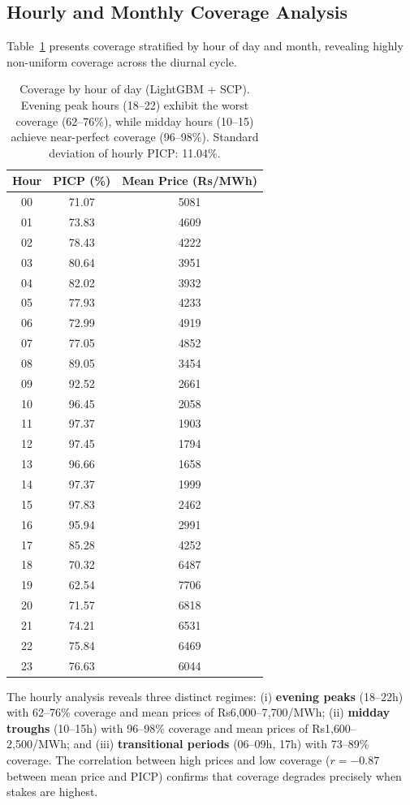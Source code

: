 \documentclass[preprint,12pt]{elsarticle}
\begin{document}
\begin{enumerate}
\subsection{Hourly and Monthly Coverage Analysis}\label{sec:hourly}

Table~\ref{tab:hourly} presents coverage stratified by hour of day and month, revealing highly non-uniform coverage across the diurnal cycle.

\begin{table}[t]
\centering
\caption{Coverage by hour of day (LightGBM + SCP). Evening peak hours (18--22) exhibit the worst coverage (62--76\%), while midday hours (10--15) achieve near-perfect coverage (96--98\%). Standard deviation of hourly PICP: 11.04\%.}
\label{tab:hourly}
\begin{tabular}{ccc}
\toprule
\textbf{Hour} & \textbf{PICP (\%)} & \textbf{Mean Price (Rs/MWh)} \\
\midrule
00 & 71.07 & 5081 \\
01 & 73.83 & 4609 \\
02 & 78.43 & 4222 \\
03 & 80.64 & 3951 \\
04 & 82.02 & 3932 \\
05 & 77.93 & 4233 \\
06 & 72.99 & 4919 \\
07 & 77.05 & 4852 \\
08 & 89.05 & 3454 \\
09 & 92.52 & 2661 \\
10 & 96.45 & 2058 \\
11 & 97.37 & 1903 \\
12 & 97.45 & 1794 \\
13 & 96.66 & 1658 \\
14 & 97.37 & 1999 \\
15 & 97.83 & 2462 \\
16 & 95.94 & 2991 \\
17 & 85.28 & 4252 \\
18 & 70.32 & 6487 \\
19 & 62.54 & 7706 \\
20 & 71.57 & 6818 \\
21 & 74.21 & 6531 \\
22 & 75.84 & 6469 \\
23 & 76.63 & 6044 \\
\bottomrule
\end{tabular}
\end{table}

The hourly analysis reveals three distinct regimes: (i) \textbf{evening peaks} (18--22h) with 62--76\% coverage and mean prices of Rs6{,}000--7{,}700/MWh; (ii) \textbf{midday troughs} (10--15h) with 96--98\% coverage and mean prices of Rs1{,}600--2{,}500/MWh; and (iii) \textbf{transitional periods} (06--09h, 17h) with 73--89\% coverage. The correlation between high prices and low coverage ($r = -0.87$ between mean price and PICP) confirms that coverage degrades precisely when stakes are highest.


\end{enumerate}
\end{document}
